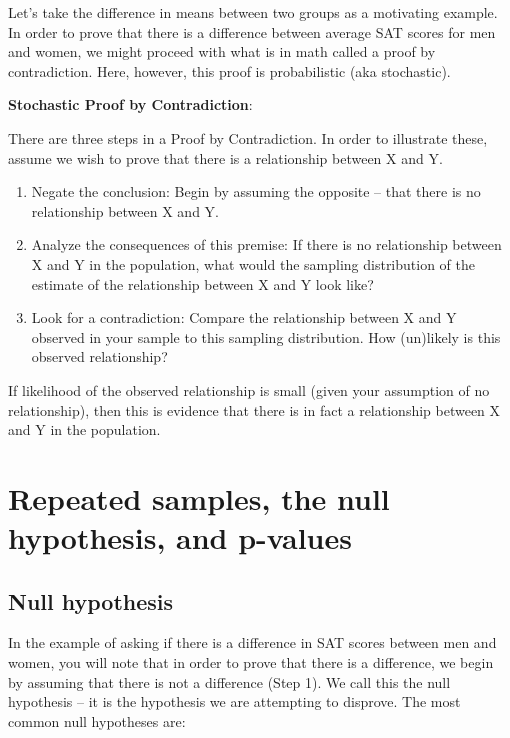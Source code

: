 \documentclass[
  letterpaper,
  DIV=11,
  numbers=noendperiod]{scrreprt}
\providecommand{\tightlist}{%
  \setlength{\itemsep}{0pt}\setlength{\parskip}{0pt}}\usepackage{longtable,booktabs,array}
\theoremstyle{definition}
\theoremstyle{remark}
\begin{document}
Let's take the difference in means between two groups as a motivating
example. In order to prove that there is a difference between average
SAT scores for men and women, we might proceed with what is in math
called a proof by contradiction. Here, however, this proof is
probabilistic (aka stochastic).

\textbf{Stochastic Proof by Contradiction}:

There are three steps in a Proof by Contradiction. In order to
illustrate these, assume we wish to prove that there is a relationship
between X and Y.

\begin{enumerate}
\def\labelenumi{\arabic{enumi}.}
\tightlist
\item
  Negate the conclusion: Begin by assuming the opposite -- that there is
  no relationship between X and Y.
\item
  Analyze the consequences of this premise: If there is no relationship
  between X and Y in the population, what would the sampling
  distribution of the estimate of the relationship between X and Y look
  like?
\item
  Look for a contradiction: Compare the relationship between X and Y
  observed in your sample to this sampling distribution. How (un)likely
  is this observed relationship?
\end{enumerate}

If likelihood of the observed relationship is small (given your
assumption of no relationship), then this is evidence that there is in
fact a relationship between X and Y in the population.

\hypertarget{repeated-samples-the-null-hypothesis-and-p-values}{%
\section{Repeated samples, the null hypothesis, and
p-values}\label{repeated-samples-the-null-hypothesis-and-p-values}}

\hypertarget{null-hypothesis}{%
\subsection{Null hypothesis}\label{null-hypothesis}}

In the example of asking if there is a difference in SAT scores between
men and women, you will note that in order to prove that there is a
difference, we begin by assuming that there is not a difference (Step
1). We call this the null hypothesis -- it is the hypothesis we are
attempting to disprove. The most common null hypotheses are:
\end{document}
